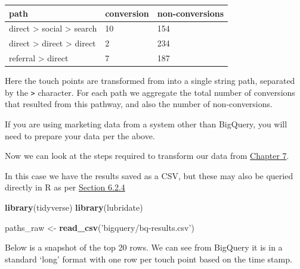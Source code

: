 \documentclass[]{book}
\newenvironment{Shaded}{\begin{snugshade}}{\end{snugshade}}
\newcommand{\KeywordTok}[1]{\textcolor[rgb]{0.13,0.29,0.53}{\textbf{#1}}}
\newcommand{\NormalTok}[1]{#1}
\newcommand{\StringTok}[1]{\textcolor[rgb]{0.31,0.60,0.02}{#1}}
\begin{document}
\begin{longtable}[]{@{}lll@{}}
\toprule
path & conversion & non-conversions\tabularnewline
\midrule
\endhead
direct \textgreater{} social \textgreater{} search & 10 & 154\tabularnewline
direct \textgreater{} direct \textgreater{} direct & 2 & 234\tabularnewline
referral \textgreater{} direct & 7 & 187\tabularnewline
\bottomrule
\end{longtable}

Here the touch points are transformed from into a single string path, separated
by the \texttt{\textgreater{}} character. For each path we aggregate the total number of conversions
that resulted from this pathway, and also the number of non-conversions.

If you are using marketing data from a system other than BigQuery, you will
need to prepare your data per the above.

Now we can look at the steps required to transform our data from \protect\hyperlink{about-the-data}{Chapter 7}.

In this case we have the results saved as a CSV, but these may also be queried
directly in R as per \protect\hyperlink{using-r-with-bigquery}{Section 6.2.4}

\begin{Shaded}
\begin{Highlighting}[]
\KeywordTok{library}\NormalTok{(tidyverse)}
\KeywordTok{library}\NormalTok{(lubridate)}

\NormalTok{paths_raw <-}\StringTok{ }\KeywordTok{read_csv}\NormalTok{(}\StringTok{'bigquery/bq-results.csv'}\NormalTok{)}
\end{Highlighting}
\end{Shaded}

Below is a snapshot of the top 20 rows. We can see from BigQuery it is in a standard
`long' format with one row per touch point based on the time stamp.
\end{document}
